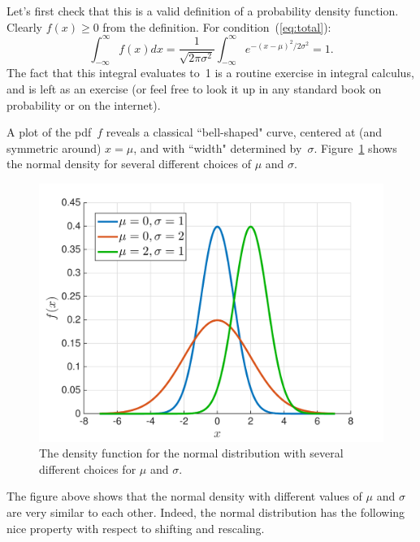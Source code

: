 \documentclass[11pt]{article}
\begin{document}
Let's first check that this is a valid definition of a probability density function. Clearly $f(x) \ge 0$ from
the definition. For condition~(\ref{eq:total}):
\begin{equation}\label{eq:totalnormal}
   \int_{-\infty}^\infty f(x)dx = \frac{1}{\sqrt{2\pi\sigma^2}} \int_{-\infty}^\infty e^{-(x-\mu)^2/2\sigma^2} =1.
\end{equation}
The fact that this integral evaluates to~1 is a routine exercise in integral calculus, and is left
as an exercise (or feel free to look it up in any standard book on probability or on the internet).


A plot of the pdf~$f$ reveals a classical ``bell-shaped" curve, centered at (and symmetric
around) $x=\mu$, and with ``width" determined by~$\sigma$. 
Figure~\ref{fig:normal} shows the normal density for several different choices of $\mu$ and $\sigma$.

\begin{figure}[h!]
\centering
\includegraphics[scale=0.4]{normal}
\caption{The density function for the normal distribution with several different choices for $\mu$ and $\sigma$.}
\label{fig:normal}
\end{figure}

The figure above shows that the normal density with different values of $\mu$ and $\sigma$ are very similar to each other.
Indeed, the normal distribution has the following nice property with respect to shifting and rescaling.
\end{document}
